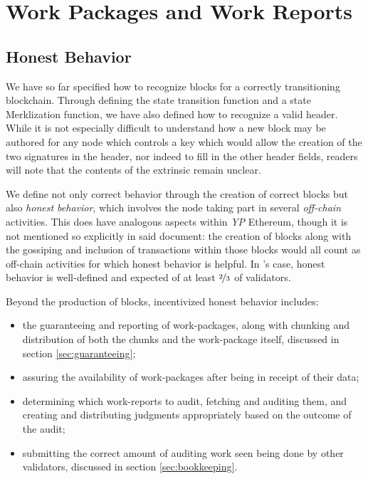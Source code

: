 \section{Work Packages and Work Reports}\label{sec:workpackagesandworkreports}

\newcommand*{\newavailabilityspecifier}{A}
\newcommand*{\itemtodigest}{C}
\newcommand*{\countupexports}{I}
\newcommand*{\importsegmentdata}{S}
\newcommand*{\justifysegmentdata}{J}
\newcommand*{\segrootlookup}{L}
\newcommand*{\pagedproofs}{P}
\newcommand*{\marshallrefine}{R}
\newcommand*{\extrinsicdata}{X}
\newcommand*{\segsX}{\mathbf{b}}
\newcommand*{\allexports}{\overline{\mathbf{e}}}

\subsection{Honest Behavior}

We have so far specified how to recognize blocks for a correctly transitioning \Jam blockchain. Through defining the state transition function and a state Merklization function, we have also defined how to recognize a valid header. While it is not especially difficult to understand how a new block may be authored for any node which controls a key which would allow the creation of the two signatures in the header, nor indeed to fill in the other header fields, readers will note that the contents of the extrinsic remain unclear.

We define not only correct behavior through the creation of correct blocks but also \emph{honest behavior}, which involves the node taking part in several \emph{off-chain} activities. This does have analogous aspects within \emph{YP} Ethereum, though it is not mentioned so explicitly in said document: the creation of blocks along with the gossiping and inclusion of transactions within those blocks would all count as off-chain activities for which honest behavior is helpful. In \Jam's case, honest behavior is well-defined and expected of at least $\nicefrac{2}{3}$ of validators.

Beyond the production of blocks, incentivized honest behavior includes:
\begin{itemize}
    \item the guaranteeing and reporting of work-packages, along with chunking and distribution of both the chunks and the work-package itself, discussed in section \ref{sec:guaranteeing};
    \item assuring the availability of work-packages after being in receipt of their data;
    \item determining which work-reports to audit, fetching and auditing them, and creating and distributing judgments appropriately based on the outcome of the audit;
    \item submitting the correct amount of auditing work seen being done by other validators, discussed in section \ref{sec:bookkeeping}.
\end{itemize}

